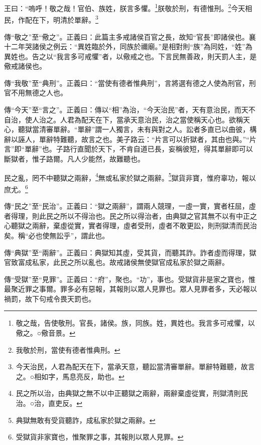 王曰：“嗚呼！敬之哉！官伯、族姓，朕言多懼。\footnote{敬之哉，告使敬刑。官長，諸侯。族，同族。姓，異姓也。我言多可戒懼，以儆之。○儆音景。}朕敬於刑，有德惟刑。\footnote{我敬於刑，當使有德者惟典刑。}今天相民，作配在下，明清於單辭。\footnote{今天治民，人君為配天在下，當承天意，聽訟當清審單辭。單辭特難聽，故言之。○相如字，馬息亮反，助也。}


{\noindent\zhuan{}\fzbyks 傳“敬之”至“儆之”。正義曰：此篇主多戒諸侯百官之長，故知“官長”即諸侯也。襄十二年哭諸侯之例云：“異姓臨於外，同族於禰廟。”是相對則“族”為同姓，“姓”為異姓也。告之以“我言多可戒懼”者，以儆戒之也。下言民無善政，則天罰人主，是儆戒諸侯也。 \par}

{\noindent\zhuan{}\fzbyks 傳“我敬”至“典刑”。正義曰：“當使有德者惟典刑”，言將選有德之人使為刑官，刑官不用無德之人也。 \par}

{\noindent\zhuan{}\fzbyks 傳“今天”至“言之”。正義曰：傳以“相”為治，“今天治民”者，天有意治民，而天不自治，使人治之。人君為配天在下，當承天意治民，治之當使稱天心也。欲稱天心，聽獄當清審單辭。“單辭”謂一人獨言，未有與對之人。訟者多直已以曲彼，構辭以誣人，單辭特難聽，故言之也。美子路云：“片言可以折獄者，其由也與。”“片言”即“單辭”也。子路行直聞於天下，不肯自道已長，妄稱彼短，得其單辭即可以斷獄者，惟子路爾。凡人少能然，故難聽也。 \par}

民之亂，罔不中聽獄之兩辭，\footnote{民之所以治，由典獄之無不以中正聽獄之兩辭，兩辭棄虛從實，刑獄清則民治。○治，直吏反。}無或私家於獄之兩辭。\footnote{典獄無敢有受貨聽詐，成私家於獄之兩辭。}獄貨非寶，惟府辜功，報以庶尤。\footnote{受獄貨非家寶也，惟聚罪之事，其報則以眾人見罪。}


{\noindent\zhuan{}\fzbyks 傳“民之”至“民治”。正義曰：“獄之兩辭”，謂兩人競理，一虛一實，實者枉屈，虛者得理，則此民之所以不得治也。民之所以得治者，由典獄之官其無不以有中正之心聽獄之兩辭，棄虛從實，實者得理，虛者受刑，虛者不敢更訟，則刑獄清而民治矣。稱“必也使無訟乎”，謂此也。 \par}

{\noindent\zhuan{}\fzbyks 傳“典獄”至“兩辭”。正義曰：典獄知其虛，受其貨，而聽其詐。詐者虛而得理，獄官致富成私家，此民之所以亂也。故戒諸侯無使獄官成私家於獄之兩辭。 \par}

{\noindent\zhuan{}\fzbyks 傳“受獄”至“見罪”。正義曰：“府”，聚也。“功”，事也。受獄貨非是家之寶也，惟最聚近罪之事爾。罪多必有惡報，其報則以眾人見罪也。眾人見罪者多，天必報以禍罰，故下句戒令畏天罰也。 \par}


